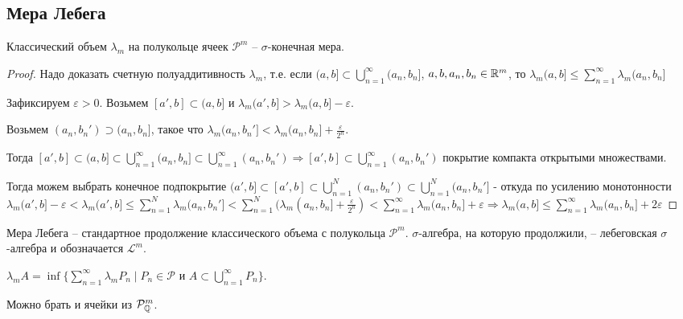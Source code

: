 \subsection{Мера Лебега}

\begin{theorem}
    Классический объем $\lambda_m$ на полукольце ячеек $\mathcal{P}^m$ – 
    $\sigma$-конечная мера.
\end{theorem}

\begin{proof}
    Надо доказать счетную полуаддитивность $\lambda_m$, т.е. если 
    $(a, b]\subset \bigcup\limits_{n=1}^\infty (a_n, b_n]$, $a, b, a_n, b_n\in \mathbb{R}^m$, то 
    $\lambda_m (a, b]\leq \sum\limits_{n=1}^\infty \lambda_m (a_n, b_n]$

    Зафиксируем $\varepsilon > 0$. Возьмем $[a', b]\subset (a, b]$ и $\lambda_m (a', b]>\lambda_m (a, b]-\varepsilon$.

    Возьмем $(a_n, b_n')\supset (a_n, b_n]$, такое что $\lambda_m (a_n, b_n'] < \lambda_m (a_n, b_n] + \frac{\varepsilon}{2^n}$.

    Тогда $[a', b]\subset (a, b]\subset \bigcup\limits_{n=1}^\infty (a_n, b_n] \subset \bigcup\limits_{n=1}^\infty (a_n, b_n') \Rightarrow [a', b] \subset \bigcup_{n = 1}^{\infty} (a_n, b_n')$
    покрытие компакта открытыми множествами.

    Тогда можем выбрать конечное подпокрытие $(a', b] \subset [a', b] \subset \bigcup_{n = 1}^{N} (a_n, b_n') \subset \bigcup_{n = 1}^{N} (a_n, b_n']$
     - откуда по усилению монотонности $\lambda_m (a', b] - \varepsilon < \lambda_m (a', b] \leq \sum_{n = 1}^{N} \lambda_m (a_n, b_n'] <
     \sum_{n = 1}^{N} (\lambda_m (a_n, b_n] + \frac{\varepsilon}{2^n}) < \sum_{n = 1}^{\infty} \lambda_m (a_n, b_n] + \varepsilon \Rightarrow
     \lambda_m (a, b] \leq \sum_{n = 1}^{\infty} \lambda_m (a_n, b_n] + 2\varepsilon$
\end{proof}

\begin{definition}
    Мера Лебега – стандартное продолжение классического объема с полукольца 
    $\mathcal{P}^m$. $\sigma$-алгебра, на которую продолжили, – лебеговская $\sigma$-алгебра
    и обозначается $\mathcal{L}^m$.
\end{definition}

\begin{remark}
    $\lambda_m A = \inf \{\sum\limits_{n=1}^\infty \lambda_m P_n \mid P_n\in \mathcal{P}\text{ и } A\subset \bigcup\limits_{n=1}^\infty P_n \}$.

    Можно брать и ячейки из $\mathcal{P}^m_{\mathbb{Q}}$.
\end{remark}


